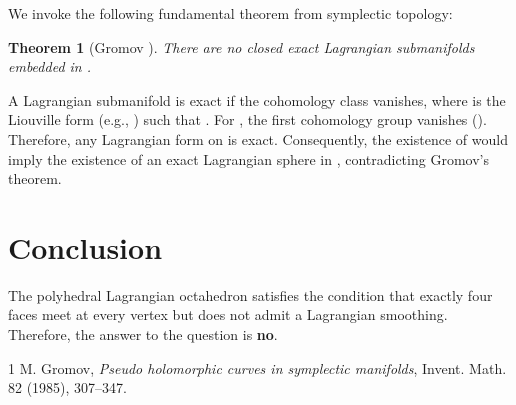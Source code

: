\documentclass[11pt]{article}
\newtheorem{theorem}{Theorem}
\theoremstyle{definition}
\begin{document}
We invoke the following fundamental theorem from symplectic topology:

\begin{theorem}[Gromov \cite{Gromov1985}]
There are no closed exact Lagrangian submanifolds embedded in .
\end{theorem}

A Lagrangian submanifold  is exact if the cohomology class  vanishes, where  is the Liouville form (e.g., ) such that .
For , the first cohomology group vanishes (). Therefore, any Lagrangian form on  is exact.
Consequently, the existence of  would imply the existence of an exact Lagrangian sphere in , contradicting Gromov's theorem.

\section{Conclusion}

The polyhedral Lagrangian octahedron satisfies the condition that exactly four faces meet at every vertex but does not admit a Lagrangian smoothing. Therefore, the answer to the question is \textbf{no}.

\begin{thebibliography}{1}
 M. Gromov, \textit{Pseudo holomorphic curves in symplectic manifolds}, Invent. Math. 82 (1985), 307--347.
\end{thebibliography}
\end{document}
